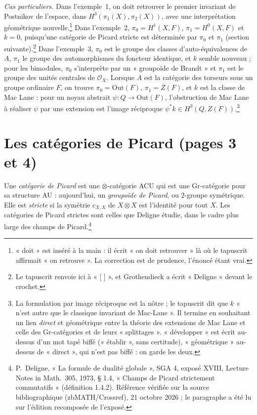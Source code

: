 \documentclass[11pt,a4paper]{article}
\begin{document}
\emph{Cas particuliers.} Dans l'exemple~1, on doit retrouver le premier
invariant de Postnikov de l'espace, dans $H^3(\pi_1(X), \pi_2(X))$, avec une
interprétation géométrique nouvelle.\footnote{« doit » est inséré à la main :
il écrit « on doit retrouver » là où le tapuscrit affirmait « on retrouve ».
La correction est de prudence, l'énoncé étant vrai.} Dans l'exemple~2,
$\pi_0 = H^1(X,F)$, $\pi_1 = H^0(X,F)$ et $k = 0$, puisqu'une catégorie de
Picard stricte est déterminée par $\pi_0$ et $\pi_1$ (section
suivante).\footnote{Le tapuscrit renvoie ici à « [ ] », et Grothendieck a
écrit « Deligne » devant le crochet.} Dans l'exemple~3, $\pi_0$ est le groupe
des classes d'auto-équivalences de $A$, $\pi_1$ le groupe des automorphismes
du foncteur identique, et $k$ semble nouveau ; pour les bimodules,
$\pi_0$ s'interprète par un « groupoïde de Brandt » et $\pi_1$
est le groupe des unités centrales de $\mathcal{O}_X$. Lorsque $A$ est la
catégorie des torseurs sous un groupe ordinaire $F$, on trouve
$\pi_0 = \mathrm{Out}(F)$, $\pi_1 = Z(F)$, et $k$ est la classe de Mac Lane :
pour un noyau abstrait $\psi : Q \to \mathrm{Out}(F)$, l'obstruction de Mac
Lane à réaliser $\psi$ par une extension est l'image réciproque
$\psi^{*}k \in H^3(Q, Z(F))$.\footnote{La formulation par image réciproque est
la nôtre ; le tapuscrit dit que $k$ « n'est autre que le classique invariant
de Mac-Lane ». Il termine en souhaitant un lien \emph{direct} et géométrique
entre la théorie des extensions de Mac Lane et celle des Gr-catégories et de
leurs « splittages ». « développer » est écrit au-dessus d'un mot tapé biffé
(« établir », sans certitude), « géométrique » au-dessus de « direct », qui
n'est pas biffé : on garde les deux.}

\section*{Les catégories de Picard (pages 3 et 4)}

Une \emph{catégorie de Picard} est une $\otimes$-catégorie ACU qui est une
Gr-catégorie pour sa structure AU : aujourd'hui, un \emph{groupoïde de
Picard}, ou $2$-groupe symétrique. Elle est \emph{stricte} si la symétrie
$c_{X,X}$ de $X \otimes X$ est l'identité pour tout $X$. Les catégories de
Picard strictes sont celles que Deligne étudie, dans le cadre plus large des
champs de Picard.\footnote{P.~Deligne, « La formule de dualité globale », SGA 4, exposé XVIII, Lecture Notes in Math.\ 305, 1973, § 1.4, « Champs de Picard strictement commutatifs » (définition 1.4.2). Référence vérifiée sur la source bibliographique (zbMATH/Crossref), 21 octobre 2026 ; le paragraphe a été lu sur l'édition recomposée de l'exposé.}
\end{document}
